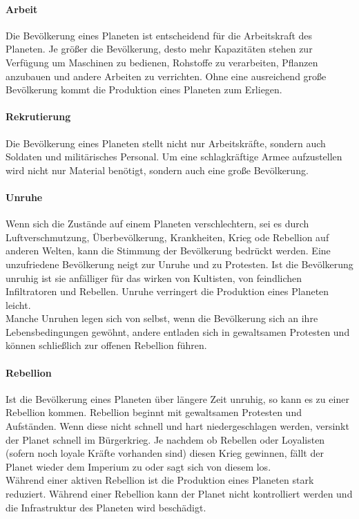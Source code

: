 \documentclass[11pt, a4paper]{article}
\begin{document}
\paragraph{Arbeit}
Die Bevölkerung eines Planeten ist entscheidend für die Arbeitskraft des Planeten. Je größer die Bevölkerung,
desto mehr Kapazitäten stehen zur Verfügung um Maschinen zu bedienen, Rohstoffe zu verarbeiten, Pflanzen
anzubauen und andere Arbeiten zu verrichten. Ohne eine ausreichend große Bevölkerung kommt die Produktion
eines Planeten zum Erliegen.
%
\paragraph{Rekrutierung}
Die Bevölkerung eines Planeten stellt nicht nur Arbeitskräfte, sondern auch Soldaten und militärisches
Personal. Um eine schlagkräftige Armee aufzustellen wird nicht nur Material benötigt, sondern auch eine große
Bevölkerung.
%
\paragraph{Unruhe}
Wenn sich die Zustände auf einem Planeten verschlechtern, sei es durch Luftverschmutzung, Überbevölkerung,
Krankheiten, Krieg ode Rebellion auf anderen Welten, kann die Stimmung der Bevölkerung bedrückt werden.
Eine unzufriedene Bevölkerung neigt zur Unruhe und zu Protesten. Ist die Bevölkerung unruhig ist sie anfälliger
für das wirken von Kultisten, von feindlichen Infiltratoren und Rebellen. Unruhe verringert die Produktion
eines Planeten leicht.\\
Manche Unruhen legen sich von selbst, wenn die Bevölkerung sich an ihre Lebensbedingungen gewöhnt, andere
entladen sich in gewaltsamen Protesten und können schließlich zur offenen Rebellion führen.
%
\paragraph{Rebellion}
Ist die Bevölkerung eines Planeten über längere Zeit unruhig, so kann es zu einer Rebellion kommen. Rebellion
beginnt mit gewaltsamen Protesten und Aufständen. Wenn diese nicht schnell und hart niedergeschlagen werden,
versinkt der Planet schnell im Bürgerkrieg. Je nachdem ob Rebellen oder Loyalisten (sofern noch loyale Kräfte
vorhanden sind) diesen Krieg gewinnen, fällt der Planet wieder dem Imperium zu oder sagt sich von diesem los.\\
Während einer aktiven Rebellion ist die Produktion eines Planeten stark reduziert. Während einer Rebellion kann
der Planet nicht kontrolliert werden und die Infrastruktur des Planeten wird beschädigt.\\
%
\end{document}
